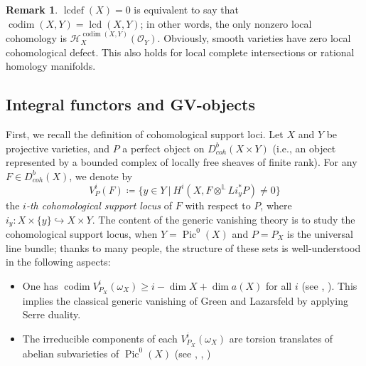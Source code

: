 \documentclass[11pt]{amsart}
\theoremstyle{definition}
\newtheorem{remark}[equation]{Remark}
\theoremstyle{plain}
\renewcommand{\H}{\mathcal H}
\renewcommand{\O}{\mathcal O}
\newcommand{\LL}{\mathbb L}
\DeclareMathOperator{\Pic}{Pic}
\DeclareMathOperator{\lcd}{lcd}
\DeclareMathOperator{\codim}{codim}
\DeclareMathOperator{\lcdef}{lcdef}
\begin{document}
\begin{remark}
    $\lcdef(X) = 0$ is equivalent to say that $\codim(X,Y) = \lcd(X,Y)$; in other words, the only nonzero local cohomology is $\H^{\codim(X,Y)}_X(\O_Y)$. Obviously, smooth varieties have zero local cohomological defect. This also holds for local complete intersections or rational homology manifolds.      
\end{remark}


\subsection{Integral functors and GV-objects} \label{section: integral functors} 
First, we recall the definition of cohomological support loci. Let $X$ and $Y$ be projective varieties, and $P$ a perfect object on $D_{coh}^b(X\times Y)$ (i.e., an object represented by a bounded complex of locally free sheaves of finite rank). For any $F \in D_{coh}^b(X)$, we denote by 
\[V^i_P(F) \coloneqq \{y\in Y\ |\ H^i(X, F\otimes^\LL Li_{y}^* P) \neq 0\}\]
the \textit{$i$-th cohomological support locus} of $F$ with respect to $P$, where $i_y: X \times \{y\} \hookrightarrow X\times Y$. The content of the generic vanishing theory is to study the cohomological support locus, when $Y = \Pic^0(X)$ and $P=P_X$ is the universal line bundle; thanks to many people, the structure of these sets is well-understood in the following aspects: 
\begin{itemize}
    \item One has $\codim V^i_{P_X}(\omega_X)\ge i-\dim X + \dim a(X)$ for all $i$ (see \cite{GL87}, \cite{GL91}). This implies the classical generic vanishing of Green and Lazarsfeld by applying Serre duality.
    \item The irreducible components of each $V^i_{P_X}(\omega_X)$ are torsion translates of abelian subvarieties of $\Pic^0(X)$ (see \cite{GL87}, \cite{GL91}, \cite{Sim-rank1_locsys})
\end{itemize}
\end{document}
